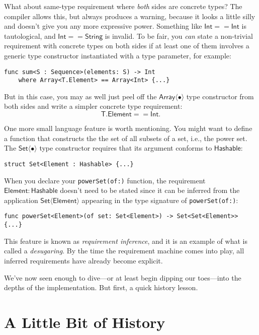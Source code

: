 \documentclass[headsepline,bibliography=totoc]{scrreport}
\newcommand{\namesym}[1]{\mathsf{#1}}
\newcommand{\genericparam}[1]{\bm{\mathsf{#1}}}
\newcommand{\proto}[1]{\bm{\mathsf{#1}}}
\theoremstyle{definition}
\theoremstyle{definition}
\theoremstyle{definition}
\begin{document}
What about same-type requirement where \emph{both} sides are concrete types? The compiler allows this, but always produces a warning, because it looks a little silly and doesn't give you any more expressive power. Something like $\namesym{Int} == \namesym{Int}$ is tautological, and $\namesym{Int} == \namesym{String}$ is invalid. To be fair, you \emph{can} state a non-trivial requirement with concrete types on both sides if at least one of them involves a generic type constructor instantiated with a type parameter, for example:
\begin{Verbatim}
func sum<S : Sequence>(elements: S) -> Int
    where Array<T.Element> == Array<Int> {...}
\end{Verbatim}
But in this case, you may as well just peel off the $\namesym{Array}\langle\bullet\rangle$ type constructor from both sides and write a simpler concrete type requirement:
\[\genericparam{T}.\namesym{Element} == \namesym{Int}.\]

One more small language feature is worth mentioning. You might want to define a function that constructs the the set of all subsets of a set, i.e., the power set. The $\namesym{Set}\langle\bullet\rangle$ type constructor requires that its argument conforms to $\proto{Hashable}$:
\begin{Verbatim}
struct Set<Element : Hashable> {...}
\end{Verbatim}
When you declare your \texttt{powerSet(of:)} function, the requirement $\genericparam{Element}\colon\proto{Hashable}$ doesn't need to be stated since it can be inferred from the application $\namesym{Set}\langle\genericparam{Element}\rangle$ appearing in the type signature of \texttt{powerSet(of:)}:
\begin{Verbatim}
func powerSet<Element>(of set: Set<Element>) -> Set<Set<Element>> {...}
\end{Verbatim}
This feature is known as \emph{requirement inference}, and it is an example of what is called a \emph{desugaring}. By the time the requirement machine comes into play, all inferred requirements have already become explicit.


We've now seen enough to dive---or at least begin dipping our toes---into the depths of the implementation. But first, a quick history lesson.

\chapter{A Little Bit of History}\label{history}
\end{document}
